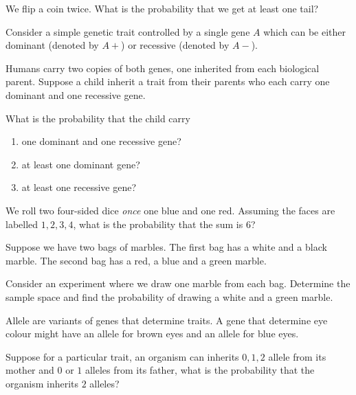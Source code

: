 \documentclass[../main.tex]{subfiles}
\begin{document}
\begin{example}
  We flip a coin twice.  What is the probability that we get at least one tail?
\end{example}

\begin{example}
  Consider a simple genetic trait controlled by a single gene \(A\) which can be either dominant (denoted by \(A+\)) or recessive (denoted by \(A-\)).

  Humans carry two copies of both genes, one inherited from each biological parent. Suppose a child inherit a trait from their parents who each carry one dominant and one recessive gene. 

  What is the probability that the child carry
  \begin{enumerate}
    \item one dominant and one recessive gene?
    \item at least one dominant gene?
    \item at least one recessive gene?
  \end{enumerate}
\end{example}

\begin{example}
  We roll two four-sided dice \emph{once} one blue and one red.  Assuming the faces are labelled \(1,2,3,4\), what is the probability that the sum is \(6\)?

\end{example}

\begin{example}
  Suppose we have two bags of marbles.  The first bag has a white and a black marble.  The second bag has a red, a blue and a green marble.

  Consider an experiment where we draw one marble from each bag.  Determine the sample space and find the probability of drawing a white and a green marble. 

\end{example}

\begin{example}
  Allele are variants of genes that determine traits.  A gene that determine eye colour might have an allele for brown eyes and an allele for blue eyes.  

  Suppose for a particular trait, an organism can inherits \(0,1,2\) allele from its mother and \(0\) or \(1\) alleles from its father, what is the probability that the organism inherits \(2\) alleles?

\end{example}
\clearpage
\end{document}
